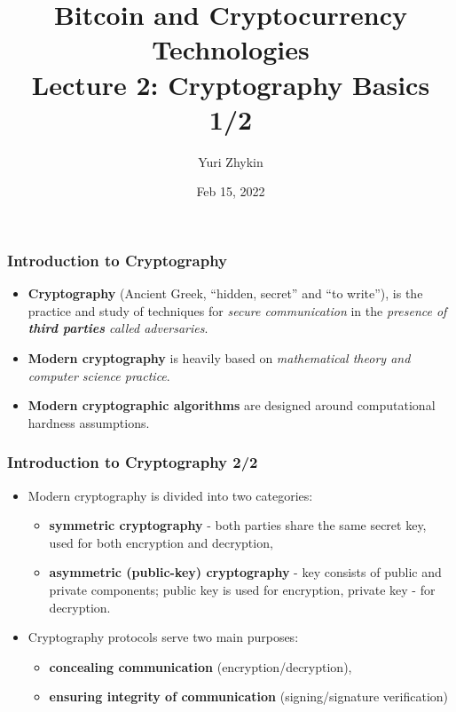 \documentclass{beamer}
\title{
  Bitcoin and Cryptocurrency Technologies \\
  Lecture 2: Cryptography Basics 1/2
}
\author{Yuri Zhykin}
\date{Feb 15, 2022}
\begin{document}
\frame{\titlepage}

\begin{frame}
  \frametitle{Introduction to Cryptography}
  \begin{itemize}
  \item \textbf{Cryptography} (Ancient Greek, ``hidden, secret'' and ``to
    write''), is the practice and study of techniques for \textit{secure
      communication} in the \textit{presence of \textbf{third parties} called
      adversaries}.
  \item \textbf{Modern cryptography} is heavily based on \textit{mathematical
      theory and computer science practice}.
  \item \textbf{Modern cryptographic algorithms} are designed around
    computational hardness assumptions.
  \end{itemize}
\end{frame}

\begin{frame}
  \frametitle{Introduction to Cryptography 2/2}
  \begin{itemize}
  \item Modern cryptography is divided into two categories:
    \begin{itemize}
    \item \textbf{symmetric cryptography} - both parties share the same secret
      key, used for both encryption and decryption,
    \item \textbf{asymmetric (public-key) cryptography} - key consists of public
      and private components; public key is used for encryption, private key -
      for decryption.
    \end{itemize}
  \item Cryptography protocols serve two main purposes:
    \begin{itemize}
    \item \textbf{concealing communication} (encryption/decryption),
    \item \textbf{ensuring integrity of communication} (signing/signature
      verification)
    \end{itemize}
  \end{itemize}
\end{frame}
\end{document}
